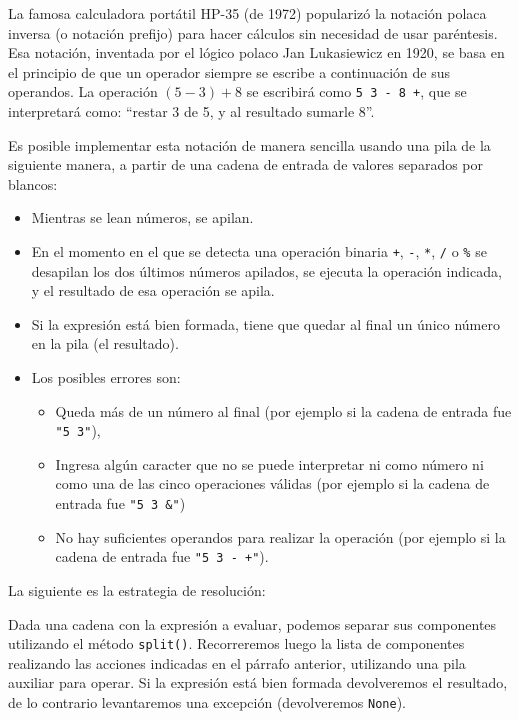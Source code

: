 La famosa calculadora portátil HP-35 (de 1972) popularizó la notación
polaca inversa (o notación prefijo) para hacer cálculos sin necesidad de
usar paréntesis. Esa notación, inventada por el lógico polaco Jan
Lukasiewicz en 1920, se basa en el principio de que un operador siempre se
escribe a continuación de sus operandos. La operación $(5-3)+8$ se
escribirá como \lstinline|5 3 - 8 +|, que se interpretará como: ``restar 3
de 5, y al resultado sumarle 8''.

Es posible implementar esta notación de manera sencilla usando una pila de
la siguiente manera, a partir de una cadena de entrada de valores separados
por blancos:

\begin{itemize}
\item Mientras se lean números, se apilan.

\item En el momento en el que se detecta una operación binaria \verb|+|,
\verb|-|, \verb|*|, \verb|/| o \verb|%| se desapilan los dos últimos
números apilados, se ejecuta la operación indicada, y el resultado de esa
operación se apila.

\item Si la expresión está bien formada, tiene que quedar al final un único
número en la pila (el resultado).

\item Los posibles errores son:

\begin{itemize}
\item Queda más de un número al final (por ejemplo si la cadena de entrada
fue \verb|"5 3"|),

\item Ingresa algún caracter que no se puede interpretar ni como número ni como
una de las cinco operaciones válidas (por ejemplo si la cadena de entrada
fue \verb|"5 3 &"|)

\item No hay suficientes operandos para realizar la operación (por ejemplo
si la cadena de entrada fue \verb|"5 3 - +"|).
\end{itemize}
\end{itemize}

La siguiente es la estrategia de resolución:

Dada una cadena con la expresión a evaluar, podemos separar sus componentes
utilizando el método \lstinline!split()!.  Recorreremos luego la lista de
componentes realizando las acciones indicadas en el párrafo anterior,
utilizando una pila auxiliar para operar. Si la expresión está bien formada
devolveremos el resultado, de lo contrario levantaremos una excepción
(devolveremos \lstinline!None!).

